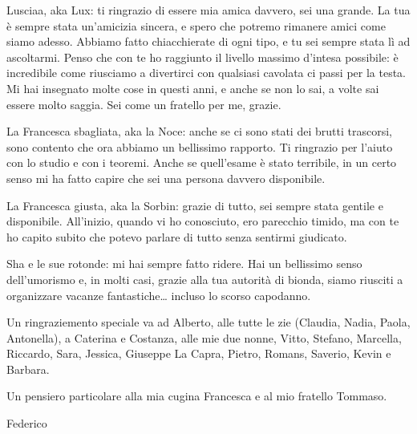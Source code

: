Lusciaa, aka Lux:
ti ringrazio di essere mia amica davvero, sei una grande.
La tua è sempre stata un’amicizia sincera, e spero che potremo rimanere amici come siamo adesso.
Abbiamo fatto chiacchierate di ogni tipo, e tu sei sempre stata lì ad ascoltarmi.
Penso che con te ho raggiunto il livello massimo d’intesa possibile: è incredibile come riusciamo a divertirci con qualsiasi cavolata ci passi per la testa.
Mi hai insegnato molte cose in questi anni, e anche se non lo sai, a volte sai essere molto saggia.
Sei come un fratello per me, grazie.

La Francesca sbagliata, aka la Noce:
anche se ci sono stati dei brutti trascorsi, sono contento che ora abbiamo un bellissimo rapporto.
Ti ringrazio per l’aiuto con lo studio e con i teoremi.
Anche se quell’esame è stato terribile, in un certo senso mi ha fatto capire che sei una persona davvero disponibile.

La Francesca giusta, aka la Sorbin:
grazie di tutto, sei sempre stata gentile e disponibile.
All’inizio, quando vi ho conosciuto, ero parecchio timido, ma con te ho capito subito che potevo parlare di tutto senza sentirmi giudicato.

Sha e le sue rotonde:
mi hai sempre fatto ridere. Hai un bellissimo senso dell’umorismo e, in molti casi, grazie alla tua autorità di bionda, siamo riusciti a organizzare vacanze fantastiche… incluso lo scorso capodanno.

Un ringraziemento speciale va ad Alberto, alle tutte le zie 
(Claudia, Nadia, Paola, Antonella),
a Caterina e Costanza,
alle mie due nonne, Vitto, Stefano, Marcella,
Riccardo, Sara, Jessica, Giuseppe La Capra, Pietro, Romans, Saverio, Kevin e Barbara. 

Un pensiero particolare alla mia cugina Francesca e al mio fratello Tommaso.


\vspace{17mm}

\vs
\begin{flushright}
 Federico
\end{flushright}

